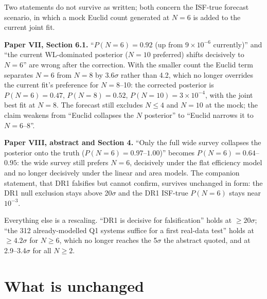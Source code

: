 \documentclass[twocolumn,11pt]{article}
\begin{document}
Two statements do not survive as written; both concern the ISF-true
forecast scenario, in which a mock Euclid count generated at $N=6$ is
added to the current joint fit.

\textbf{Paper VII, Section 6.1.} ``$P(N=6)=0.92$ (up from
$9\times10^{-6}$ currently)'' and ``the current WL-dominated posterior
($N=10$ preferred) shifts decisively to $N=6$'' are wrong after the
correction. With the smaller count the Euclid term separates $N=6$ from
$N=8$ by 3.6$\sigma$ rather than 4.2, which no longer overrides the
current fit's preference for $N=8$--10: the corrected posterior is
$P(N=6)=0.47$, $P(N=8)=0.52$, $P(N=10)=3\times10^{-4}$, with the joint
best fit at $N=8$. The forecast still excludes $N\leq4$ and $N=10$ at
the mock; the claim weakens from ``Euclid collapses the $N$ posterior''
to ``Euclid narrows it to $N=6$--8''.

\textbf{Paper VIII, abstract and Section 4.} ``Only the full wide
survey collapses the posterior onto the truth ($P(N=6)=0.97$--$1.00$)''
becomes $P(N=6)=0.64$--$0.95$: the wide survey still prefers $N=6$,
decisively under the flat efficiency model and no longer decisively
under the linear and area models. The companion statement, that DR1
falsifies but cannot confirm, survives unchanged in form: the DR1 null
exclusion stays above 20$\sigma$ and the DR1 ISF-true $P(N=6)$ stays
near $10^{-3}$.

Everything else is a rescaling. ``DR1 is decisive for falsification''
holds at $\geq20\sigma$; ``the 312 already-modelled Q1 systems suffice
for a first real-data test'' holds at $\geq4.2\sigma$ for $N\geq6$,
which no longer reaches the 5$\sigma$ the abstract quoted, and at
2.9--3.4$\sigma$ for all $N\geq2$.

\section{What is unchanged}
\label{sec:unchanged}
\end{document}
